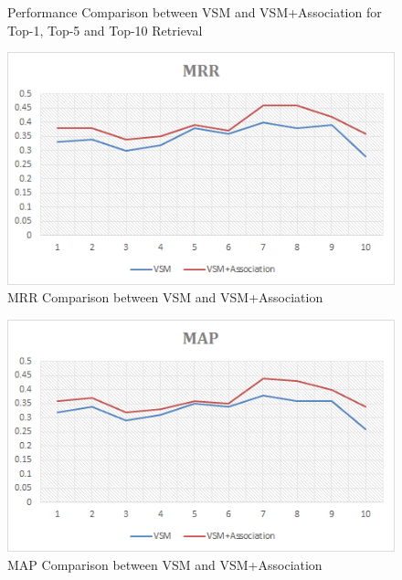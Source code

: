 \documentclass[conference]{IEEEtran}
\begin{document}
\begin{figure}
	\caption {Performance Comparison between VSM and VSM+Association for Top-1, Top-5 and Top-10 Retrieval}
	\label{fig:VSM+AssoTopK}
\end{figure}
\begin{figure}
	\centering
	\includegraphics[scale=0.70]{VSM+AssoTop-MRR}
	\caption {MRR Comparison between VSM and VSM+Association}
	\label{fig:VSM+AssoTop-MRR}
\end{figure}
\begin{figure}
	\centering
	\includegraphics[scale=0.70]{VSM+AssoTop-MAP}
	\caption {MAP Comparison between VSM and VSM+Association}
	\label{fig:VSM+AssoTop-MAP}
\end{figure}
\end{document}
